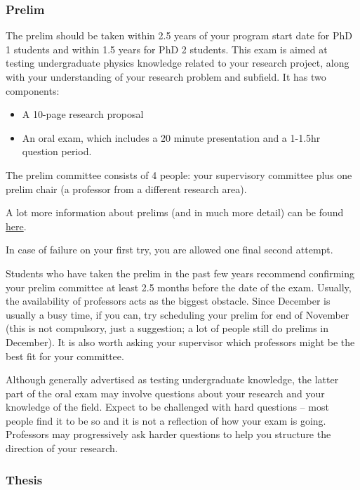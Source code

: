     \subsubsection{Prelim} 

    The prelim should be taken within 2.5 years of your program start date for PhD 1 students and within 1.5 years for PhD 2 students. This exam is aimed at testing undergraduate physics knowledge related to your research project, along with your understanding of your research problem and subfield. It has two components:
    \begin{itemize}
        \item A 10-page research proposal 
        \item An oral exam, which includes a 20 minute presentation and a 1-1.5hr question period.
    \end{itemize}

    The prelim committee consists of 4 people: your supervisory committee plus one prelim chair (a professor from a different research area).

    A lot more information about prelims (and in much more detail) can be found \href{https://www.physics.mcgill.ca/grads/prelim-candidate.html}{here}.

    In case of failure on your first try, you are allowed one final second attempt.

    Students who have taken the prelim in the past few years recommend confirming your prelim committee at least 2.5 months before the date of the exam. Usually, the availability of professors acts as the biggest obstacle. Since December is usually a busy time, if you can, try scheduling your prelim for end of November (this is not compulsory, just a suggestion; a lot of people still do prelims in December). It is also worth asking your supervisor which professors might be the best fit for your committee. 
    
    Although generally advertised as testing undergraduate knowledge, the latter part of the oral exam may involve questions about your research and your knowledge of the field. Expect to be challenged with hard questions -- most people find it to be so and it is not a reflection of how your exam is going. Professors may progressively ask harder questions to help you structure the direction of your research.

    \subsubsection{Thesis} 

